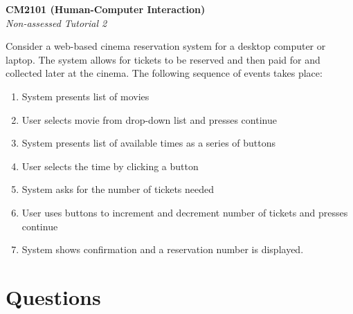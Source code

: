 \documentclass[11pt,a4paper]{report}
\begin{document}
\noindent\Large\textbf{CM2101 (Human-Computer Interaction)}\\
\noindent\large\textit{Non-assessed Tutorial 2}
\vskip30pt

Consider a web-based cinema reservation system for a desktop computer or laptop. The system allows for tickets to be reserved and then paid for and collected later at the cinema. The following sequence of events takes place:
\begin{enumerate}
    \item System presents list of movies
    \item User selects movie from drop-down list and presses continue
    \item System presents list of available times as a series of buttons
    \item User selects the time by clicking a button
    \item System asks for the number of tickets needed
    \item User uses buttons to increment and decrement number of tickets and presses continue
    \item System shows confirmation and a reservation number is displayed.
\end{enumerate}

\section*{Questions}
\end{document}
